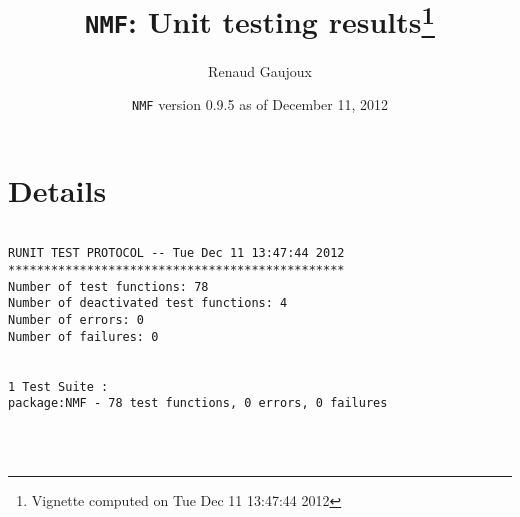 \documentclass[10pt]{article}
\author{Renaud Gaujoux}
\title{\texttt{NMF}: Unit testing results\footnote{Vignette computed  on Tue Dec 11 13:47:44 2012}}
\date{\texttt{NMF} version 0.9.5 as of December 11, 2012}
\begin{document}
\maketitle

\section{Details}
\begin{verbatim}

RUNIT TEST PROTOCOL -- Tue Dec 11 13:47:44 2012 
*********************************************** 
Number of test functions: 78 
Number of deactivated test functions: 4 
Number of errors: 0 
Number of failures: 0 

 
1 Test Suite : 
package:NMF - 78 test functions, 0 errors, 0 failures




\end{verbatim}
\end{document}
